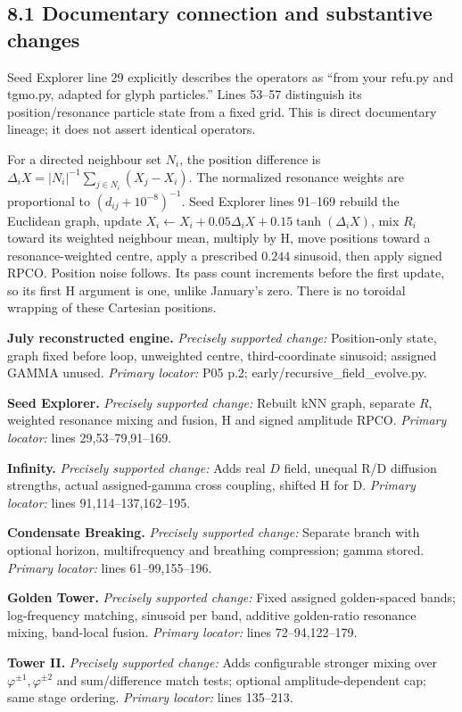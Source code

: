 \documentclass[11pt,a4paper]{article}
\begin{document}
\subsection*{8.1 Documentary connection and substantive changes}

Seed Explorer line 29 explicitly describes the operators as ``from your refu.py and tgmo.py, adapted for glyph particles.'' Lines 53--57 distinguish its position/resonance particle state from a fixed grid. This is direct documentary lineage; it does not assert identical operators.


For a directed neighbour set $N_i$, the position difference is
$\Delta_iX=|N_i|^{-1}\sum_{j\in N_i}(X_j-X_i)$.
The normalized resonance weights are proportional to $(d_{ij}+10^{-8})^{-1}$.
Seed Explorer lines 91--169 rebuild the Euclidean graph, update
$X_i\leftarrow X_i+0.05\Delta_iX+0.15\tanh(\Delta_iX)$,
mix $R_i$ toward its weighted neighbour mean, multiply by H, move positions toward a resonance-weighted centre, apply a prescribed $0.244$ sinusoid, then apply signed RPCO. Position noise follows. Its pass count increments before the first update, so its first H argument is one, unlike January's zero. There is no toroidal wrapping of these Cartesian positions.


\par\smallskip\noindent\textbf{July reconstructed engine.} 
\textit{Precisely supported change:} Position-only state, graph fixed before loop, unweighted centre, third-coordinate sinusoid; assigned GAMMA unused. \textit{Primary locator:} P05 p.2; early/recursive\_\allowbreak{}field\_\allowbreak{}evolve.py.
\par\smallskip\noindent\textbf{Seed Explorer.} 
\textit{Precisely supported change:} Rebuilt kNN graph, separate $R$, weighted resonance mixing and fusion, H and signed amplitude RPCO. \textit{Primary locator:} lines 29,53--79,91--169.
\par\smallskip\noindent\textbf{Infinity.} 
\textit{Precisely supported change:} Adds real $D$ field, unequal R/D diffusion strengths, actual assigned-gamma cross coupling, shifted H for D. \textit{Primary locator:} lines 91,114--137,162--195.
\par\smallskip\noindent\textbf{Condensate Breaking.} 
\textit{Precisely supported change:} Separate branch with optional horizon, multifrequency and breathing compression; gamma stored. \textit{Primary locator:} lines 61--99,155--196.
\par\smallskip\noindent\textbf{Golden Tower.} 
\textit{Precisely supported change:} Fixed assigned golden-spaced bands; log-frequency matching, sinusoid per band, additive golden-ratio resonance mixing, band-local fusion. \textit{Primary locator:} lines 72--94,122--179.
\par\smallskip\noindent\textbf{Tower II.} 
\textit{Precisely supported change:} Adds configurable stronger mixing over $\varphi^{\pm1},\varphi^{\pm2}$ and sum/difference match tests; optional amplitude-dependent cap; same stage ordering. \textit{Primary locator:} lines 135--213.
\end{document}
